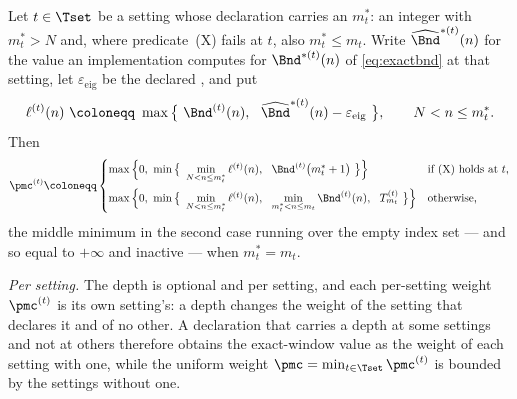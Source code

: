 \begin{definition}
\label{def:pmcex}
Let $t\in\Tset$ be a setting whose declaration carries an
$m^{\ast}_t$: an integer with $m^{\ast}_t>N$ and, where predicate~(X)
fails at $t$, also $m^{\ast}_t\le m_t$. Write $\widehat\Bnd^{\ast(t)}(n)$ for
the value an implementation computes for $\Bnd^{\ast(t)}(n)$ of
\eqref{eq:exactbnd} at that setting, let $\varepsilon_{\mathrm{eig}}$ be the
declared
,
and put
\begin{equation}\label{eq:elldef}
  \ell^{(t)}(n)\ \coloneqq\
  \max\big\{\ \Bnd^{(t)}(n),\ \ \widehat\Bnd^{\ast(t)}(n)
   -\varepsilon_{\mathrm{eig}}\ \big\},
  \qquad N<n\le m^{\ast}_t .
\end{equation}
Then
\begin{equation}\label{eq:pmcex}
  \pmc^{(t)}\coloneqq
  \begin{cases}
    \max\Big\{0,\ \min\big\{\ \min\limits_{N<n\le m^{\ast}_t}\ell^{(t)}(n),
      \ \ \Bnd^{(t)}\big(m^{\ast}_t+1\big)\ \big\}\Big\}
      &\text{if (X) holds at }t,\\[10pt]
    \max\Big\{0,\ \min\big\{\ \min\limits_{N<n\le m^{\ast}_t}\ell^{(t)}(n),
      \ \ \min\limits_{m^{\ast}_t<n\le m_t}\Bnd^{(t)}(n),
      \ \ T^{(t)}_{m_t}\ \big\}\Big\}
      &\text{otherwise,}
  \end{cases}
\end{equation}
the middle minimum in the second case running over the empty index set ---
and so equal to $+\infty$ and inactive --- when $m^{\ast}_t=m_t$.

\emph{Per setting.} The depth is optional and per setting, and each
per-setting weight $\pmc^{(t)}$ is its own setting's: a depth changes the
weight of the setting that declares it and of no other. A declaration that
carries a depth at some settings and not at others therefore obtains the
exact-window value as the weight of each setting with one, while the uniform
weight $\pmc=\min_{t\in\Tset}\pmc^{(t)}$ is bounded by the settings without
one.
\end{definition}
